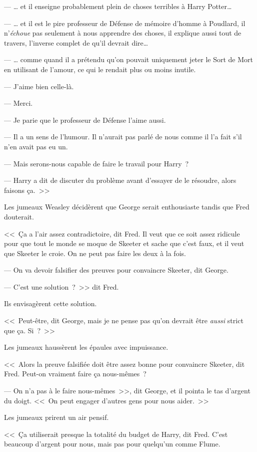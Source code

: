 --- … et il enseigne probablement plein de choses terribles à Harry Potter…

--- … et il est le pire professeur de Défense de mémoire d'homme à Poudlard, il n'\emph{échoue} pas seulement à nous apprendre des choses, il explique aussi tout de travers, l'inverse complet de qu'il devrait dire…

--- … comme quand il a prétendu qu'on pouvait uniquement jeter le Sort de Mort en utilisant de l'amour, ce qui le rendait plus ou moins inutile.

--- J'aime bien celle-là.

--- Merci.

--- Je parie que le professeur de Défense l'aime aussi.

--- Il a un sens de l'humour. Il n'aurait pas parlé de nous comme il l'a fait s'il n'en avait pas eu un.

--- Mais serons-nous capable de faire le travail pour Harry~?

--- Harry a dit de discuter du problème avant d'essayer de le résoudre, alors faisons ça.~>>

Les jumeaux Weasley décidèrent que George serait enthousiaste tandis que Fred douterait.

<<~Ça a l'air assez contradictoire, dit Fred. Il veut que ce soit assez ridicule pour que tout le monde se moque de Skeeter et sache que c'est faux, et il veut que Skeeter le croie. On ne peut pas faire les deux à la fois.

--- On va devoir falsifier des preuves pour convaincre Skeeter, dit George.

--- C'est une solution~?~>> dit Fred.

Ils envisagèrent cette solution.

<<~Peut-être, dit George, mais je ne pense pas qu'on devrait être \emph{aussi} strict que ça. Si~?~>>

Les jumeaux haussèrent les épaules avec impuissance.

<<~Alors la preuve falsifiée doit être assez bonne pour convaincre Skeeter, dit Fred. Peut-on vraiment faire ça nous-mêmes~?

--- On n'a pas à le faire nous-mêmes~>>, dit George, et il pointa le tas d'argent du doigt. <<~On peut engager d'autres gens pour nous aider.~>>

Les jumeaux prirent un air pensif.

<<~Ça utiliserait presque la totalité du budget de Harry, dit Fred. C'est beaucoup d'argent pour nous, mais pas pour quelqu'un comme Flume.

